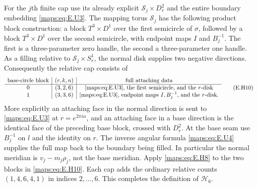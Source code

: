 \begin{theorem}
For the $j$th finite cap use its already explicit
$\mathcal S_j\times D^2_r$ and the entire boundary embedding
\eqref{maps:eq:E.U3}.  The mapping torus $\mathcal S_j$ has the following product
block construction: a block $T^3\times D^1$ over the first
semicircle of $\sigma$, followed by a block $T^3\times D^1$ over
the second semicircle, with endpoint maps $I$ and $B_j^{-1}$.
The first is a three-parameter zero handle, the second a
three-parameter one handle.  As a filling relative to
$\mathcal S_j\times S^1_r$, the normal disk supplies two negative
directions.  Consequently the relative cap consists of
\[
 \begin{array}{c|c|c}
 \hbox{base-circle block}&(r,k,n)&\hbox{full attaching data}\\ \hline
 0&(3,2,6)&\hbox{\eqref{maps:eq:E.U3}, the first semicircle, and the $r$-disk}\\
 1&(3,3,6)&\hbox{\eqref{maps:eq:E.U3}, endpoint maps $I,B_j^{-1}$, and the $r$-disk}.
 \end{array}
 \tag{E.H10}\label{maps:eq:E.H10}
\]
More explicitly an attaching face in the normal direction is sent
to \eqref{maps:eq:E.U3} at $r=e^{2\pi i\alpha}$, and an attaching face in a
base direction is the identical face of the preceding base block,
crossed with $D^2_r$.  At the base seam use $B_j^{-1}$ on $l$ and
the identity on $r$.  The inverse angular formula \eqref{maps:eq:E.U4} supplies
the full map back to the boundary being filled.  In particular
the normal meridian is $v_j-m_j\rho_j$, not the base meridian.
Apply \eqref{maps:eq:E.H8} to the two blocks in \eqref{maps:eq:E.H10}.  Each cap adds the
ordinary relative counts $(1,4,6,4,1)$ in indices $2,\ldots,6$.
This completes the definition of $\mathcal H_6$.


\end{theorem}
